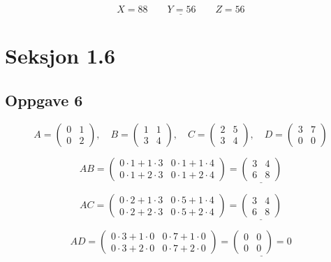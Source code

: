 \documentclass{article}
\begin{document}
\[\underline{X = 88 \qquad Y = 56 \qquad Z = 56}\]


\hfill
\hfill

\section*{Seksjon 1.6}

\subsection*{Oppgave 6}

\[A = \begin{pmatrix}
    0 & 1 \\ 0 & 2
\end{pmatrix}, \quad 
B = \begin{pmatrix}
    1 & 1 \\ 3 & 4
\end{pmatrix}, \quad
C = \begin{pmatrix}
    2 & 5 \\ 3 & 4
\end{pmatrix}, \quad
D = \begin{pmatrix}
    3 & 7 \\ 0 & 0
\end{pmatrix}\]

\[AB = \begin{pmatrix}
    0 \cdot 1 + 1 \cdot 3 & 0 \cdot 1 + 1 \cdot 4 \\ 0 \cdot 1 + 2 \cdot 3 & 0 \cdot 1 + 2 \cdot 4
\end{pmatrix} = \underline{\begin{pmatrix}
    3 & 4 \\ 6 & 8
\end{pmatrix}}\]

\[AC = \begin{pmatrix}
    0 \cdot 2 + 1 \cdot 3 & 0 \cdot 5 + 1 \cdot 4 \\ 0 \cdot 2 + 2 \cdot 3 & 0 \cdot 5 + 2 \cdot 4
\end{pmatrix} = \underline{\begin{pmatrix}
    3 & 4 \\ 6 & 8
\end{pmatrix}}\]

\[AD = \begin{pmatrix}
    0 \cdot 3 + 1 \cdot 0 & 0 \cdot 7 + 1 \cdot 0 \\ 0 \cdot 3 + 2 \cdot 0 & 0 \cdot 7 + 2 \cdot 0
\end{pmatrix} = \underline{\begin{pmatrix}
    0 & 0 \\ 0 & 0
\end{pmatrix} = 0}\]
\end{document}
